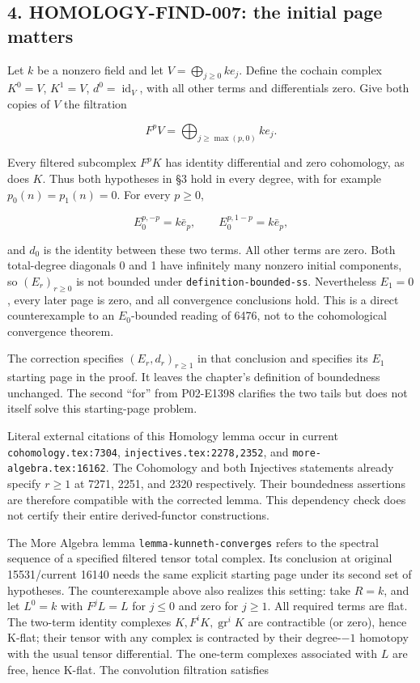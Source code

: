 \subsection{4. HOMOLOGY-FIND-007: the initial page matters}\label{note-07-homology-find-007-the-initial-page-matters}

Let \(k\) be a nonzero field and let \(V=\bigoplus_{j\geq0}ke_j\). Define the cochain complex \(K^0=V\), \(K^1=V\), \(d^0=\operatorname{id}_V\), with all other terms and differentials zero. Give both copies of \(V\) the filtration

\[
F^pV=\bigoplus_{j\geq\max(p,0)}ke_j.
\]

Every filtered subcomplex \(F^pK\) has identity differential and zero cohomology, as does \(K\). Thus both hypotheses in §3 hold in every degree, with for example \(p_0(n)=p_1(n)=0\). For every \(p\geq0\),

\[
E_0^{p,-p}=k\bar e_p,\qquad
E_0^{p,1-p}=k\bar e_p,
\]

and \(d_0\) is the identity between these two terms. All other terms are zero. Both total-degree diagonals 0 and 1 have infinitely many nonzero initial components, so \((E_r)_{r\geq0}\) is not bounded under \texttt{definition-bounded-ss}. Nevertheless \(E_1=0\), every later page is zero, and all convergence conclusions hold. This is a direct counterexample to an \(E_0\)-bounded reading of 6476, not to the cohomological convergence theorem.

The correction specifies \((E_r,d_r)_{r\geq1}\) in that conclusion and specifies its \(E_1\) starting page in the proof. It leaves the chapter's definition of boundedness unchanged. The second ``for'' from P02-E1398 clarifies the two tails but does not itself solve this starting-page problem.

Literal external citations of this Homology lemma occur in current \texttt{cohomology.tex:7304}, \texttt{injectives.tex:2278,2352}, and \texttt{more-algebra.tex:16162}. The Cohomology and both Injectives statements already specify \(r\geq1\) at 7271, 2251, and 2320 respectively. Their boundedness assertions are therefore compatible with the corrected lemma. This dependency check does not certify their entire derived-functor constructions.

The More Algebra lemma \texttt{lemma-kunneth-converges} refers to the spectral sequence of a specified filtered tensor total complex. Its conclusion at original 15531/current 16140 needs the same explicit starting page under its second set of hypotheses. The counterexample above also realizes this setting: take \(R=k\), and let \(L^0=k\) with \(F^jL=L\) for \(j\leq0\) and zero for \(j\geq1\). All required terms are flat. The two-term identity complexes \(K,F^iK,\operatorname{gr}^iK\) are contractible (or zero), hence K-flat; their tensor with any complex is contracted by their degree-\(-1\) homotopy with the usual tensor differential. The one-term complexes associated with \(L\) are free, hence K-flat. The convolution filtration satisfies

